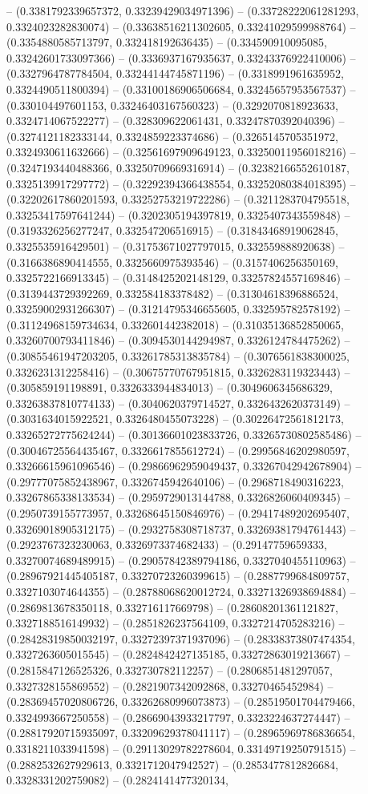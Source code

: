 -- (0.3381792339657372, 0.33239429034971396) -- (0.33728222061281293, 0.3324023282830074) -- (0.33638516211302605, 0.33241029599988764) -- (0.3354880585713797, 0.332418192636435) -- (0.334590910095085, 0.33242601733097366) -- (0.3336937167935637, 0.33243376922410006) -- (0.3327964787784504, 0.33244144745871196) -- (0.3318991961635952, 0.3324490511800394) -- (0.33100186906506684, 0.33245657953567537) -- (0.330104497601153, 0.33246403167560323) -- (0.3292070818923633, 0.3324714067522277) -- (0.328309622061431, 0.33247870392040396) -- (0.3274121182333144, 0.3324859223374686) -- (0.3265145705351972, 0.3324930611632666) -- (0.32561697909649123, 0.33250011956018216) -- (0.3247193440488366, 0.33250709669316914) -- (0.32382166552610187, 0.3325139917297772) -- (0.32292394366438554, 0.33252080384018395) -- (0.32202617860201593, 0.33252753219722286) -- (0.3211283704795518, 0.33253417597641244) -- (0.3202305194397819, 0.3325407343559848) -- (0.3193326256277247, 0.332547206516915) -- (0.31843468919062845, 0.3325535916429501) -- (0.31753671027797015, 0.332559888920638) -- (0.3166386890414555, 0.3325660975393546) -- (0.3157406256350169, 0.3325722166913345) -- (0.3148425202148129, 0.33257824557169846) -- (0.3139443729392269, 0.332584183378482) -- (0.31304618396886524, 0.33259002931266307) -- (0.31214795346655605, 0.332595782578192) -- (0.31124968159734634, 0.332601442382018) -- (0.31035136852850065, 0.33260700793411846) -- (0.3094530144294987, 0.3326124784475262) -- (0.30855461947203205, 0.33261785313835784) -- (0.3076561838300025, 0.3326231312258416) -- (0.30675770767951815, 0.3326283119323443) -- (0.305859191198891, 0.3326333944834013) -- (0.3049606345686329, 0.33263837810774133) -- (0.3040620379714527, 0.3326432620373149) -- (0.3031634015922521, 0.3326480455073228) -- (0.30226472561812173, 0.33265272775624244) -- (0.30136601023833726, 0.33265730802585486) -- (0.30046725564435467, 0.3326617855612724) -- (0.29956846202980597, 0.33266615961096546) -- (0.29866962959049437, 0.33267042942678904) -- (0.29777075852438967, 0.3326745942640106) -- (0.2968718490316223, 0.33267865338133534) -- (0.2959729013144788, 0.3326826060409345) -- (0.2950739155773957, 0.33268645150846976) -- (0.29417489202695407, 0.33269018905312175) -- (0.2932758308718737, 0.33269381794761443) -- (0.2923767323230063, 0.3326973374682433) -- (0.29147759659333, 0.33270074689489915) -- (0.29057842389794186, 0.3327040455110963) -- (0.28967921445405187, 0.33270723260399615) -- (0.2887799684809757, 0.3327103074644355) -- (0.28788068620012724, 0.33271326938694884) -- (0.2869813678350118, 0.332716117669798) -- (0.28608201361121827, 0.3327188516149932) -- (0.2851826237564109, 0.3327214705283216) -- (0.28428319850032197, 0.33272397371937096) -- (0.28338373807474354, 0.3327263605015545) -- (0.2824842427135185, 0.33272863019213667) -- (0.2815847126525326, 0.332730782112257) -- (0.2806851481297057, 0.3327328155869552) -- (0.2821907342092868, 0.33270465452984) -- (0.28369457020806726, 0.33262680996073873) -- (0.28519501704479466, 0.3324993667250558) -- (0.28669043933217797, 0.3323224637274447) -- (0.28817920715935097, 0.33209629378041117) -- (0.28965969786836654, 0.3318211033941598) -- (0.29113029782278604, 0.33149719250791515) -- (0.2882532627929613, 0.3321712047942527) -- (0.2853477812826684, 0.3328331202759082) -- (0.2824141477320134, 